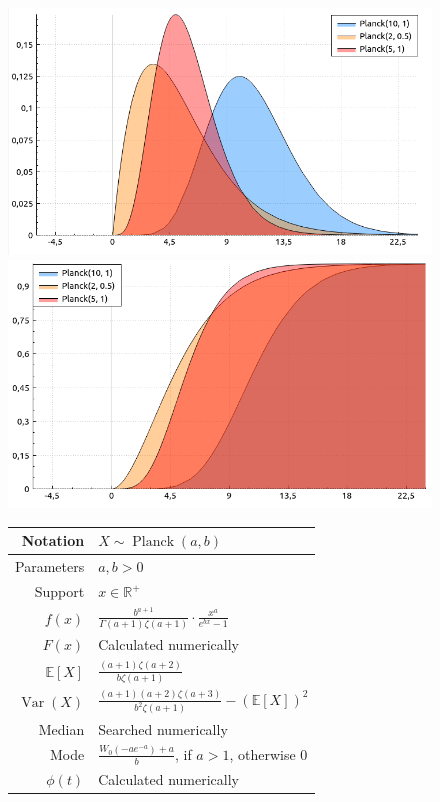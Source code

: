 \documentclass[a4paper,11pt]{article}
\theoremstyle{plain}
\theoremstyle{definition}
\newcommand{\ME}{\mathbb{E}}
\newcommand{\MR}{\mathbb{R}}
\newcommand{\Var}{\operatorname{Var}}
\begin{document}
	\begin{figure}[!htb]\centering
		\begin{minipage}{0.55\textwidth}
			\includegraphics[width=\linewidth, right]{planck_pdf}
			\captionsetup{labelformat=empty}
			\includegraphics[width=\linewidth, right]{planck_cdf}
			\captionsetup{labelformat=empty}
		\end{minipage}
		\begin{minipage}{0.4\textwidth}
		\begin{tabular}{| r | l |}
			\hline
			Notation & $X \sim \operatorname{Planck}(a, b)$ \\
			\hline
			Parameters & $a, b > 0$ \\
			\hline
			Support & $ x \in \MR^+$  \\
			\hline
			$f(x)$ & $\frac{b^{a+1}}{\Gamma(a+1)\zeta(a+1)} \cdot \frac{x ^ a}{e^{bx} - 1}$ \\
			\hline
			$F(x)$ & Calculated numerically \\
			\hline
			$\ME[X]$ & $ \frac{(a+1)\zeta(a+2)}{b \zeta(a+1)}$ \\
			\hline
			$\Var(X)$ & $\frac{(a+1)(a+2)\zeta(a+3)}{b^2 \zeta(a+1)}  - (\ME[X])^2$ \\
			\hline
			Median & Searched numerically \\
			\hline
			Mode & $\frac{W_0(-a e^{-a}) + a}{b}$, if $a > 1$, otherwise $0$ \\
			\hline
			$\phi(t)$ & Calculated numerically \\
			\hline
		\end{tabular}
	\end{minipage}
    \end{figure}
\end{document}
